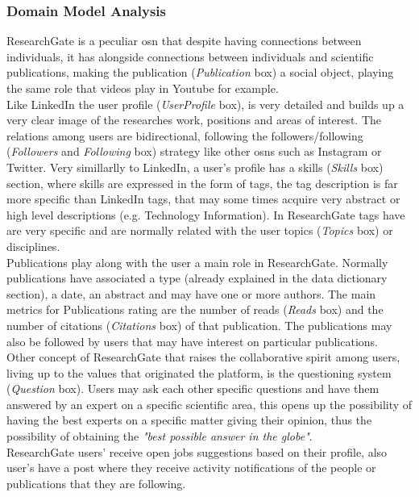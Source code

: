 \subsubsection*{Domain Model Analysis}
ResearchGate is a peculiar \gls{osn} that despite having connections between individuals, it has alongside connections between individuals and scientific publications,
making the publication (\textit{Publication} box) a social object, playing the same role that videos play in Youtube for example.\\
\indent Like LinkedIn the user profile (\textit{UserProfile} box), is very detailed and builds up a very clear image of the researches work, positions and areas of interest. The relations
among users are bidirectional, following the followers/following (\textit{Followers} and \textit{Following} box) strategy like other \glspl{osn} such as Instagram or Twitter. Very simillarlly to LinkedIn, a
user's profile has a skills (\textit{Skills} box) section, where skills are expressed in the form of tags, the tag description is far more specific than LinkedIn tags, that may some
times acquire very abstract or high level descriptions (e.g. Technology Information). In ResearchGate tags have are very specific and are
normally related with the user topics (\textit{Topics} box) or disciplines.\\
\indent Publications play along with the user a main role in ResearchGate. Normally publications have associated a type (already explained in the data dictionary section), a date, an abstract and may have one or more authors. The main metrics for Publications rating are the number of reads (\textit{Reads} box) and the number of
citations (\textit{Citations} box) of that publication. The publications may also be followed by users that may have interest on particular publications.\\
\indent Other concept of ResearchGate that raises the collaborative spirit among users, living up to the values that originated the platform, is the questioning system
(\textit{Question} box). Users may ask each other specific questions and have them answered by an expert on a specific scientific area, this opens up the possibility of having
the best experts on a specific matter giving their opinion, thus the possibility of obtaining the \textit{"best possible answer in the globe"}.\\
\indent ResearchGate users' receive open jobs suggestions based on their profile, also user's have a post where they receive activity notifications of the people
or publications that they are following.

